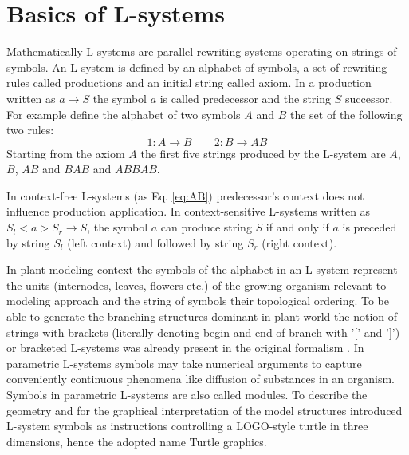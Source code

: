 \section{Basics of L-systems}

Mathematically L-systems  are parallel rewriting  systems operating on
strings of symbols. An L-system  is defined by an alphabet of symbols,
a  set of  rewriting rules  called productions  and an  initial string
called axiom. In a production  written as $a \rightarrow S$ the symbol
$a$ is called  predecessor and the string $S$  successor.  For example
define  the  alphabet of  two  symbols  $A$ and  $B$  the  set of  the
following two rules:
\begin{equation}\label{eq:AB}
1: A \rightarrow B \qquad 2: B \rightarrow AB 
\end{equation}
Starting from  the axiom  $A$ the first  five strings produced  by the
L-system are $A$, $B$, $AB$ and $BAB$ and $ABBAB$.

In context-free L-systems  (as Eq.  \ref{eq:AB}) predecessor's context
does  not  influence  production  application.   In  context-sensitive
L-systems written as $S_l < a > S_r \rightarrow S$, the symbol $a$ can
produce string  $S$ if  and only  if $a$ is  preceded by  string $S_l$
(left context) and followed by string $S_r$ (right context).

In plant modeling  context the symbols of the  alphabet in an L-system
represent the units (internodes, leaves, flowers etc.)  of the growing
organism relevant to modeling approach and the string of symbols their
topological ordering.  To be able to generate the branching structures
dominant in plant world the notion of strings with brackets (literally
denoting  begin and  end  of branch  with  '[' and  ']') or  bracketed
L-systems   was   already    present   in   the   original   formalism
\citep{lindenmayer:68}.    In   parametric  L-systems   \citep{pp:90a}
symbols   may  take  numerical   arguments  to   capture  conveniently
continuous  phenomena like  diffusion  of substances  in an  organism.
Symbols in parametric L-systems  are also called modules.  To describe
the  geometry  and  for  the  graphical interpretation  of  the  model
structures \citet{pp:86}  introduced L-system symbols  as instructions
controlling   a   LOGO-style   turtle  \citep{abelson:82}   in   three
dimensions, hence the adopted name Turtle graphics.

